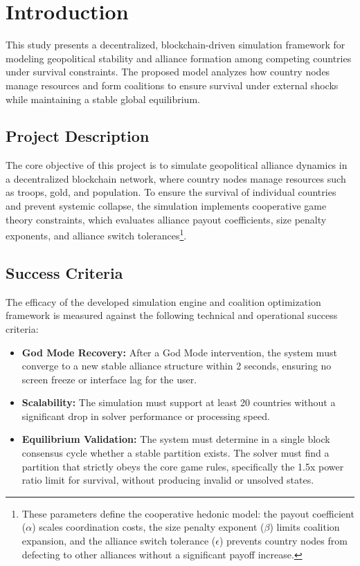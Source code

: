 \clearpage

\chapter{Introduction}

This study presents a decentralized, blockchain-driven simulation framework for modeling geopolitical stability and alliance formation among competing countries under survival constraints. 
The proposed model analyzes how country nodes manage resources and form coalitions to ensure survival under external shocks while maintaining a stable global equilibrium.

\section{Project Description}

The core objective of this project is to simulate geopolitical alliance dynamics in a decentralized blockchain network, where country nodes manage resources such as troops, gold, and population. To ensure the survival of individual countries and prevent systemic collapse, the simulation implements cooperative game theory constraints, which evaluates alliance payout coefficients, size penalty exponents, and alliance switch tolerances\footnote{These parameters define the cooperative hedonic model: the payout coefficient ($\alpha$) scales coordination costs, the size penalty exponent ($\beta$) limits coalition expansion, and the alliance switch tolerance ($\epsilon$) prevents country nodes from defecting to other alliances without a significant payoff increase.}.


\section{Success Criteria}

The efficacy of the developed simulation engine and coalition optimization framework is measured against the following technical and operational success criteria:

\begin{itemize}
    \item \textbf{God Mode Recovery:} After a God Mode intervention, the system must converge to a new stable alliance structure within 2 seconds, ensuring no screen freeze or interface lag for the user.
    \item \textbf{Scalability:} The simulation must support at least 20 countries without a significant drop in solver performance or processing speed.
    \item \textbf{Equilibrium Validation:} The system must determine in a single block consensus cycle whether a stable partition exists. The solver must find a partition that strictly obeys the core game rules, specifically the 1.5x power ratio limit for survival, without producing invalid or unsolved states.

\end{itemize}

